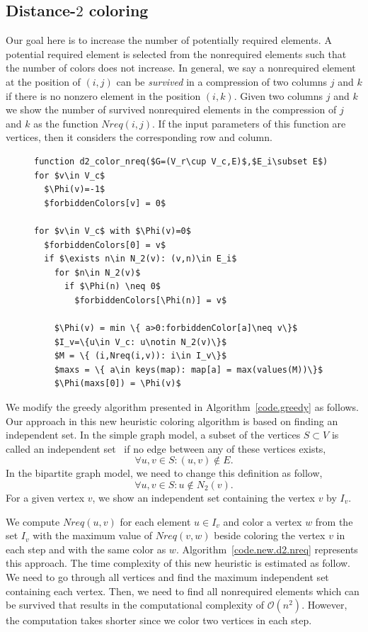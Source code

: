 \documentclass[12pt, twoside,a4paper,toc=bibliography]{scrbook}
\newcommand{\coderef}[1]{Algorithm~\protect\ref{#1}}
\begin{document}
\subsection{Distance-$2$ coloring}
Our goal here is to increase the number of potentially required elements.
A potential required element is selected from the nonrequired elements such that
the number of colors does not increase.
In general, we say a nonrequired element at the position of $(i,j)$
can be \textit{survived} in a compression of two columns $j$ and $k$
if there is no nonzero element in the position $(i,k)$.
Given two columns $j$ and $k$
we show the number of survived nonrequired elements in the compression of
$j$ and $k$ as the function $Nreq(i,j)$.
If the input parameters of this function are vertices,
then it considers the corresponding row and column.
\begin{figure}
\begin{lstlisting}[caption=New coloring heuristic for distance-$2$ coloring
considering the nonrequired elements.,label=code.new.d2.nreq,mathescape]
function d2_color_nreq($G=(V_r\cup V_c,E)$,$E_i\subset E$)
for $v\in V_c$
  $\Phi(v)=-1$
  $forbiddenColors[v] = 0$

for $v\in V_c$ with $\Phi(v)=0$
  $forbiddenColors[0] = v$
  if $\exists n\in N_2(v): (v,n)\in E_i$
    for $n\in N_2(v)$
      if $\Phi(n) \neq 0$
        $forbiddenColors[\Phi(n)] = v$

    $\Phi(v) = min \{ a>0:forbiddenColor[a]\neq v\}$
    $I_v=\{u\in V_c: u\notin N_2(v)\}$
    $M = \{ (i,Nreq(i,v)): i\in I_v\}$
    $maxs = \{ a\in keys(map): map[a] = max(values(M))\}$
    $\Phi(maxs[0]) = \Phi(v)$
\end{lstlisting}
\end{figure}
We modify the greedy algorithm  presented in \coderef{code.greedy} as follows.
Our approach in this new heuristic coloring algorithm is based on finding an independent set.
In the simple graph model, a subset of the vertices $S\subset V$ is
called an independent set~\cite{bondy2008graph} if no edge between any of these vertices exists,
$$\forall u,v\in S: (u,v)\notin E.$$
In the bipartite graph model, we need to change this definition as follow,
$$\forall u,v\in S: u\notin N_2(v).$$
For a given vertex $v$, we show an independent set containing the vertex $v$ by $I_v$.

We compute $Nreq(u,v)$ for each element $u\in I_v$
and color a vertex $w$ from the set $I_v$ with the maximum value of $Nreq(v,w)$
beside coloring the vertex $v$ in each step and with the same color as $w$.
\coderef{code.new.d2.nreq} represents this approach.
The time complexity of this new heuristic is estimated as follow.
We need to go through all vertices
and find the maximum independent set containing each vertex.
Then, we need to find all nonrequired elements which can be survived
that results in the computational complexity of $\mathcal{O}(n^2)$.
However, the computation takes shorter since we color two vertices in each step.
\end{document}
